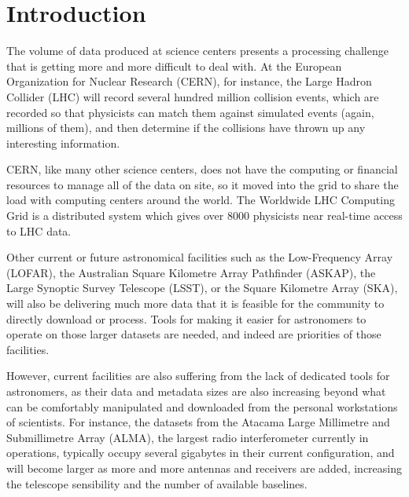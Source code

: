 \chapter{Introduction}


The volume of data produced at
science centers presents a
processing challenge
that is getting more and more difficult to deal with.
At the European Organization for Nuclear Research
(CERN), for instance,
the Large Hadron Collider (LHC) will record
several hundred million collision events,
which are recorded so that physicists can match them against simulated events (again, millions of them), and then determine if the collisions have thrown up any interesting information.

CERN, like many other science centers, does not have the computing or financial resources to manage all of the data
on site,
so it moved into the grid to share the load with computing centers around the world. The Worldwide LHC Computing Grid is a distributed system which gives over 8000 physicists near real-time access to LHC data.

Other current or future astronomical  facilities such as the Low-Frequency Array (LOFAR), the Australian Square Kilometre Array Pathfinder (ASKAP), the Large Synoptic Survey Telescope (LSST), or the Square Kilometre Array (SKA), will also be delivering much more data that it is feasible for the community to directly download or process. Tools for making
it
easier for astronomers to operate on those larger datasets are needed, and indeed are priorities of those facilities.


However, current facilities are also suffering from the lack of dedicated tools for astronomers, as their data and metadata sizes are also increasing beyond what can be comfortably manipulated and downloaded from the personal workstations of scientists. For instance, the datasets from the Atacama Large Millimetre and Submillimetre Array (ALMA), the largest radio interferometer currently in operations, typically occupy several gigabytes in their current configuration, and will become larger as more and more antennas and receivers are %
added, increasing the telescope sensibility and the number of available baselines.

